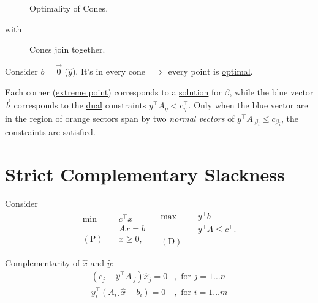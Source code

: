 \begin{figure}[H]
	\centering
	\caption[Caption for LOF]{Optimality of Cones.\protect\footnotemark}
	\label{fig:opt-cones}
\end{figure}
with
\begin{figure}[H]
	\centering
	\caption{Cones join together.}
	\label{fig:cones-join}
\end{figure}

\begin{note}
	Consider \(b = \vec{0}\) (\(\hat{y}\)). It's in every cone \(\implies\) every point is \hyperref[def:optimal-solution]{optimal}.
\end{note}

\begin{remark}
	Each corner (\hyperref[def:extreme-point]{extreme point}) corresponds to a \hyperref[def:solution]{solution} for \(\beta\), while the blue vector \(\vec{b}\) corresponds to the \hyperref[def:dual]{dual} constraints \(y^{\top} A_{\eta}<c_{\eta}^{\top}\). Only when the blue vector are in the region of orange sectors span by two \emph{normal vectors} of \(y^{\top}A_{\cdot \beta_i}\leq c_{\beta_i}\), the constraints are satisfied.
\end{remark}

\section{Strict Complementary Slackness}
Consider
\[
	\begin{aligned}
		\min~             & c^{\top}x \\
		                  & Ax = b    \\
		(\mathrm{P})\quad & x\geq  0,
	\end{aligned}\quad \begin{aligned}
		\max ~            & y^{\top}b               \\
		                  & y^{\top}A\leq c^{\top}. \\
		(\mathrm{D})\quad &
	\end{aligned}
\]

\begin{prev}
	\hyperref[def:complementary]{Complementarity} of \(\hat{x}\) and \(\hat{y}\)\(\colon\)
	\[
		\begin{split}
			(c_{j} - \hat{y}^{\top} A_{\cdot j}) \hat{x}_j = 0&, \text{ for }j = 1\ldots n\\
			y^{\top}_i (A_{i\cdot}\hat{x} - b_{i}) = 0&, \text{ for } i = 1\ldots m
		\end{split}
	\]
\end{prev}

